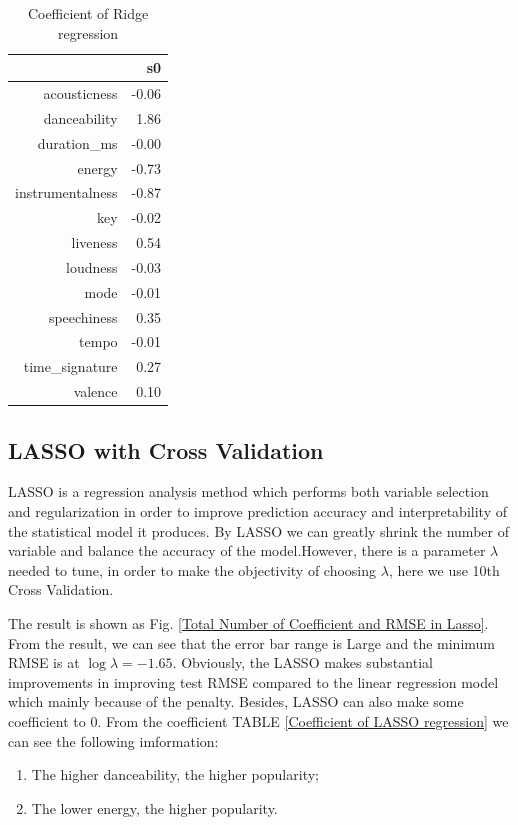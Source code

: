 \documentclass[conference]{IEEEtran}
\begin{document}
\begin{table}[ht]
\centering
\caption{Coefficient of Ridge regression}
\begin{tabular}{rr}
  \hline
 & s0 \\ 
  \hline
acousticness & -0.06 \\ 
  danceability & 1.86 \\ 
  duration\_ms & -0.00 \\ 
  energy & -0.73 \\ 
  instrumentalness & -0.87 \\ 
  key & -0.02 \\ 
  liveness & 0.54 \\ 
  loudness & -0.03 \\ 
  mode & -0.01 \\ 
  speechiness & 0.35 \\ 
  tempo & -0.01 \\ 
  time\_signature & 0.27 \\ 
  valence & 0.10 \\ 
   \hline
\end{tabular}
\label{Coefficient of Ridge regression}		
\end{table}

\subsection{LASSO with Cross Validation}
LASSO is a regression analysis method which performs both variable selection and regularization in order to improve prediction accuracy and interpretability of the statistical model it produces\cite{tibshirani1996regression}. By LASSO we can greatly shrink the number of variable and balance the accuracy of the model.However, there is a parameter $\lambda$ needed to tune, in order to make the objectivity of choosing $\lambda$, here we use 10th Cross Validation\cite{kohavi1995study}. 

The result is shown as Fig. \ref{Total Number of Coefficient and RMSE in Lasso}. From the result, we can see that the error bar range is Large and the minimum RMSE is at $\log\lambda=-1.65$. Obviously, the LASSO makes substantial improvements in improving test RMSE compared to the linear regression model which mainly because of the penalty. Besides, LASSO can also make some coefficient to $0$. From the coefficient TABLE \ref{Coefficient of LASSO regression} we can see the following imformation:
\begin{enumerate}
  \item The higher danceability, the higher popularity;
  \item The lower energy, the higher popularity.
\end{enumerate}
 
\end{document}
